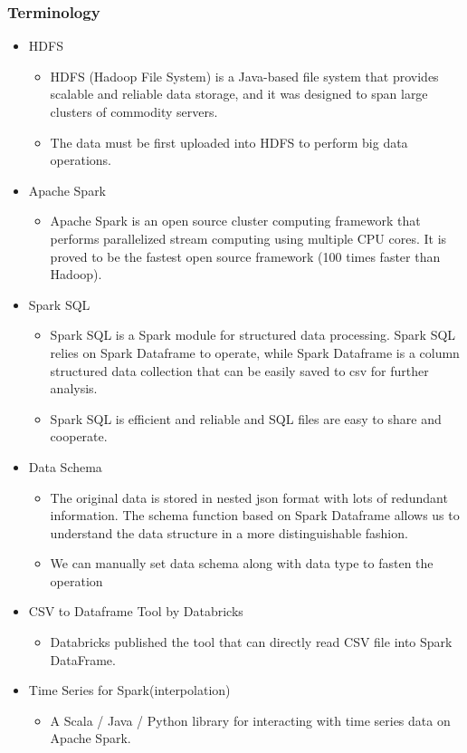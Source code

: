 \documentclass[12pt,journal,compsoc]{IEEEtran}
\begin{document}
\subsubsection*{Terminology}
\begin{itemize}
\item HDFS
\begin{itemize}
\item HDFS (Hadoop File System) is a Java-based file system that provides scalable and reliable data storage, and it was designed to span large clusters of commodity servers.
\item The data must be first uploaded into HDFS to perform big data operations.
\end{itemize}
\item Apache Spark
\begin{itemize}
\item Apache Spark is an open source cluster computing framework that performs parallelized stream computing using multiple CPU cores. It is proved to be the fastest open source framework (100 times faster than Hadoop).
\end{itemize}
\item Spark SQL
\begin{itemize}
\item Spark SQL is a Spark module for structured data processing.  Spark SQL relies on Spark Dataframe to operate, while Spark Dataframe is a column structured data collection that can be easily saved to csv for further analysis. 
\item Spark SQL is efficient and reliable and SQL files are easy to share and cooperate.

\end{itemize}
\item Data Schema
\begin{itemize}
\item The original data is stored in nested json format with lots of redundant information.
The schema function based on Spark Dataframe allows us to understand the data structure in a more distinguishable fashion.
\item We can manually set data schema along with data type to fasten the operation
\end{itemize}
\item CSV to Dataframe Tool by Databricks
\begin{itemize}
\item Databricks published the tool that can directly read CSV file into Spark DataFrame.
\end{itemize}
\item Time Series for Spark(interpolation)
\begin{itemize}
\item A Scala / Java / Python library for interacting with time series data on Apache Spark.
\end{itemize}


\end{itemize}
\end{document}
